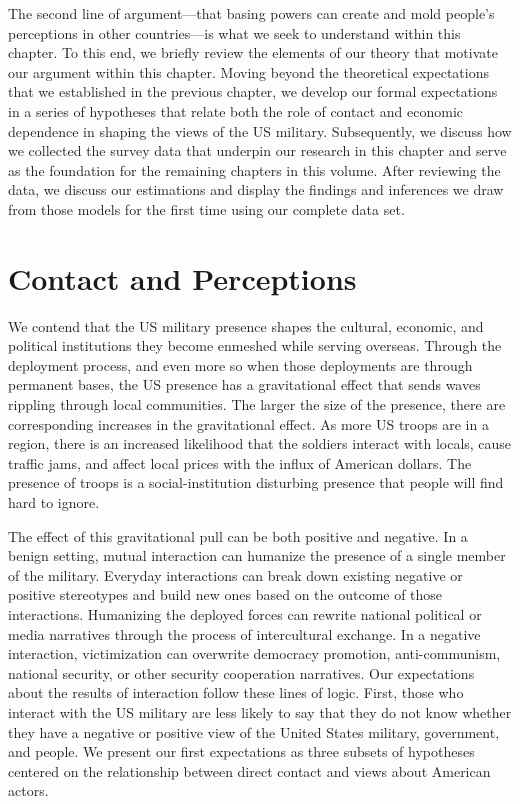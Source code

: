 The second line of argument---that basing powers can create and mold people's perceptions in other countries---is what we seek to understand within this chapter. To this end, we briefly review the elements of our theory that motivate our argument within this chapter. Moving beyond the theoretical expectations that we established in the previous chapter, we develop our formal expectations in a series of hypotheses that relate both the role of contact and economic dependence in shaping the views of the US military. Subsequently, we discuss how we collected the survey data that underpin our research in this chapter and serve as the foundation for the remaining chapters in this volume. After reviewing the data,  we discuss our estimations and display the findings and inferences we draw from those models for the first time using our complete data set.


\section*{Contact and Perceptions}

We contend that the US military presence shapes the cultural, economic, and political institutions they become enmeshed while serving overseas. Through the deployment process, and even more so when those deployments are through permanent bases, the US presence has a gravitational effect that sends waves rippling through local communities. The larger the size of the presence, there are corresponding increases in the gravitational effect. As more US troops are in a region, there is an increased likelihood that the soldiers interact with locals, cause traffic jams, and affect local prices with the influx of American dollars. The presence of troops is a social-institution disturbing presence that people will find hard to ignore.

The effect of this gravitational pull can be both positive and negative. In a benign setting, mutual interaction can humanize the presence of a single member of the military. Everyday interactions can break down existing negative or positive stereotypes and build new ones based on the outcome of those interactions. Humanizing the deployed forces can rewrite national political or media narratives through the process of intercultural exchange. In a negative interaction, victimization can overwrite democracy promotion, anti-communism, national security, or other security cooperation narratives. Our expectations about the results of interaction follow these lines of logic. First, those who interact with the US military are less likely to say that they do not know whether they have a negative or positive view of the United States military, government, and people. We present our first expectations as three subsets of hypotheses centered on the relationship between direct contact and views about American actors. 

